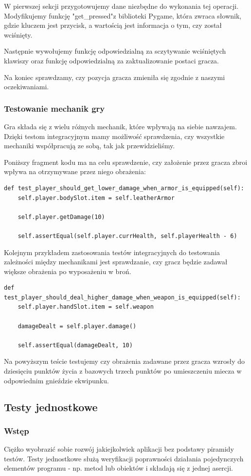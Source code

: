 \documentclass{article}
\begin{document}
W pierwszej sekcji przygotowujemy dane niezbędne do wykonania tej operacji. Modyfikujemy funkcję "get\_pressed"\space z biblioteki Pygame, która zwraca słownik, gdzie kluczem jest przycisk, a wartością jest informacja o tym, czy został wciśnięty.

Następnie wywołujemy funkcję odpowiedzialną za sczytywanie wciśniętych klawiszy oraz funkcję odpowiedzialną za zaktualizowanie postaci gracza.

Na koniec sprawdzamy, czy pozycja gracza zmieniła się zgodnie z naszymi oczekiwaniami.
\subsubsection{Testowanie mechanik gry}
Gra składa się z wielu różnych mechanik, które wpływają na siebie nawzajem. Dzięki testom integracyjnym mamy możliwość sprawdzenia, czy wszystkie mechaniki współpracują ze sobą, tak jak przewidzieliśmy.

Poniższy fragment kodu ma na celu sprawdzenie, czy założenie przez gracza zbroi wpływa na otrzymywane przez niego obrażenia:
\begin{lstlisting}[language=pythonSchema]
def test_player_should_get_lower_damage_when_armor_is_equipped(self):
    self.player.bodySlot.item = self.leatherArmor

    self.player.getDamage(10)

    self.assertEqual(self.player.currHealth, self.playerHealth - 6)
\end{lstlisting}

Kolejnym przykładem zastosowania testów integracyjnych do testowania zależności między mechanikami jest sprawdzanie, czy gracz będzie zadawał większe obrażenia po wyposażeniu w broń.
\begin{lstlisting}[language=pythonSchema]
def test_player_should_deal_higher_damage_when_weapon_is_equipped(self):
    self.player.handSlot.item = self.weapon

    damageDealt = self.player.damage()

    self.assertEqual(damageDealt, 10)
\end{lstlisting}
Na powyższym teście testujemy czy obrażenia zadawane przez gracza wzrosły do dziesięciu punktów życia z bazowych trzech punktów po umieszczeniu miecza w odpowiednim gnieździe ekwipunku.
\subsection{Testy jednostkowe}
\subsubsection{Wstęp}
Ciężko wyobrazić sobie rozwój jakiejkolwiek aplikacji bez podstawy piramidy testów. Testy jednostkowe służą weryfikacji poprawności działania pojedynczych elementów programu - np. metod lub obiektów i składają się z jednej asercji.
\end{document}
